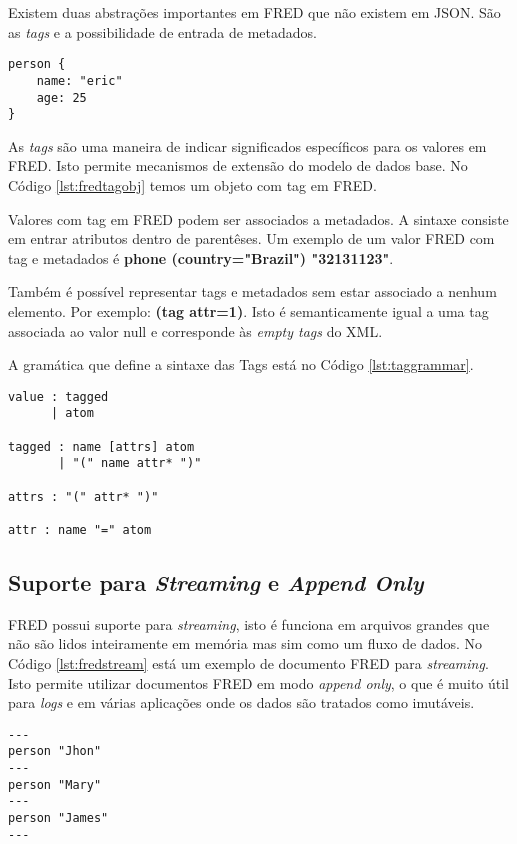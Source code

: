 Existem duas abstrações importantes em FRED que não existem em JSON. São as \textit{tags} e a possibilidade de entrada 
de metadados.

\begin{lstlisting}[caption=Exemplo de dicionário com Tag em FRED,label={lst:fredtagobj}]
person {
    name: "eric"
    age: 25
}
\end{lstlisting}
    
As \textit{tags} são uma maneira de indicar significados específicos para os valores em FRED. Isto permite
mecanismos de extensão do modelo de dados base. No Código \ref{lst:fredtagobj} 
temos um objeto com tag em FRED.

Valores com tag em FRED podem ser associados a metadados. A sintaxe consiste em entrar 
atributos dentro de parentêses. Um exemplo de um valor FRED com tag e metadados 
é \textbf{phone (country="Brazil") "32131123"}.

Também é possível representar tags e metadados sem estar associado a nenhum elemento. 
Por exemplo: \textbf{(tag attr=1)}. Isto é semanticamente igual a uma tag associada ao valor null
e corresponde às \textit{empty tags} do XML.

A gramática que define a sintaxe das Tags está no Código \ref{lst:taggrammar}.

\begin{lstlisting}[caption=Gramática para tags e metadados,label={lst:taggrammar}]
value : tagged
      | atom

tagged : name [attrs] atom
       | "(" name attr* ")" 

attrs : "(" attr* ")"

attr : name "=" atom
\end{lstlisting}

\subsection{Suporte para \textit{Streaming} e \textit{Append Only}}

FRED possui suporte para \textit{streaming}, isto é funciona em 
arquivos grandes que não são lidos inteiramente em memória mas sim como um fluxo de dados. 
No Código \ref{lst:fredstream} está um exemplo de documento FRED para \textit{streaming}. Isto permite
utilizar documentos FRED em modo \textit{append only}, o que é muito útil
para \textit{logs} e em várias aplicações onde os dados são tratados como imutáveis.

\begin{lstlisting}[float,floatplacement=H,caption=Exemplo de documento com streaming em FRED,label={lst:fredstream}]
---
person "Jhon"
---
person "Mary"
---
person "James"
---
\end{lstlisting}

